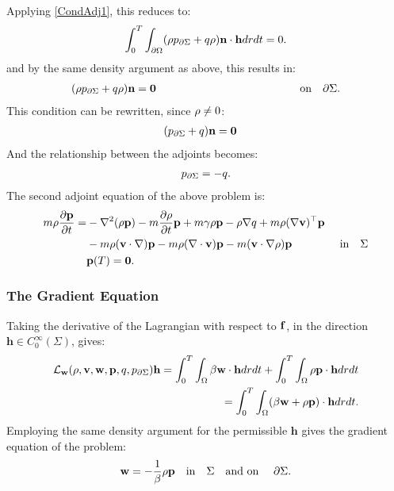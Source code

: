 Applying \ref{CondAdj1}, this reduces to:
\begin{align*}
\int_0^T \int_{\partial\Omega} (\rho  {p}_{\partial \Sigma} + q \rho)  \mathbf{n}\cdot \mathbf{h} dr dt=0.
\end{align*}
and by the same density argument as above, this results in:
\begin{align*}
(\rho  {p}_{\partial \Sigma} + q \rho)  \mathbf{n} =\mathbf{0} \qquad \qquad\qquad\qquad\qquad\qquad \quad \text{on} \quad \partial \Sigma.
\end{align*}
This condition can be rewritten, since $\rho \neq 0$:
\begin{align*}
&( {p}_{\partial \Sigma} + q ) \mathbf{n} =\mathbf{0}
\end{align*}
And the relationship between the adjoints becomes:
\begin{align*}
{p}_{\partial \Sigma} = -q.
\end{align*}
The second adjoint equation of the above problem is:
\begin{align*}
  m\rho \frac{\partial \mathbf{p}}{\partial t} =& -\nabla^2 (\rho \mathbf{p}) - m \frac{\partial \rho}{\partial t} \mathbf{p}   +m \gamma \rho \mathbf{p}-\rho\nabla q +m \rho (\nabla \mathbf{v})^\top\mathbf{p} \\
&-m \rho (\mathbf{v} \cdot \nabla)\mathbf{p} - m \rho (\nabla \cdot \mathbf{v})\mathbf{p}  - m (\mathbf{v} \cdot \nabla \rho)\mathbf{p}  \ \qquad\qquad \text{in} \quad \Sigma\\
&\mathbf{p}(T)=\mathbf{0}.
\end{align*}

\subsubsection*{The Gradient Equation}
Taking the derivative of the Lagrangian with respect to $\mathbf{f}$, in the direction $\mathbf{h} \in C_0^\infty(\Sigma)$, gives:
\begin{align*}
\mathcal{L}_{\mathbf{w}}(\rho,\mathbf{v},\mathbf{w},\mathbf{p},q,{p}_{\partial \Sigma}) \mathbf{h}= \int_0^T \int_\Omega \beta \mathbf{w} \cdot \mathbf{h} dr dt + \int_0^T \int_\Omega \rho \mathbf{p} \cdot \mathbf{h} dr dt \\
= \int_0^T \int_\Omega ( \beta \mathbf{w} + \rho \mathbf{p}) \cdot \mathbf{h} dr dt.
\end{align*}
Employing the same density argument for the permissible $\mathbf{h}$ gives the gradient equation of the problem:
\begin{align*}
 \mathbf{w} = - \frac{1}{\beta} \rho \mathbf{p} \quad \text{in} \quad \Sigma \quad \text{and on } \quad \partial\Sigma.
\end{align*}

